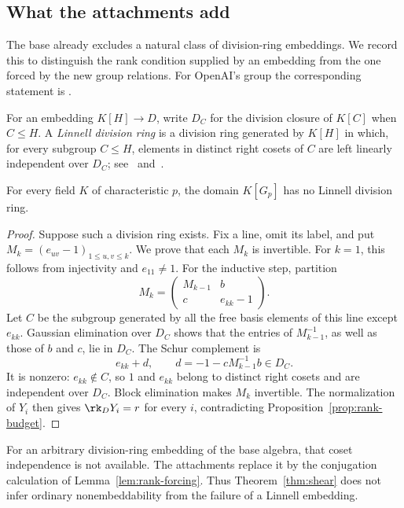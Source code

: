 \subsection{What the attachments add}

The base already excludes a natural class of division-ring embeddings.
We record this to distinguish the rank condition supplied by an
embedding from the one forced by the new group relations.
For OpenAI's group the corresponding statement is
\cite[Theorem~1.4 and Corollary~6.5]{DM}.

For an embedding \(K[H]\to D\), write \(D_C\) for the division
closure of \(K[C]\) when \(C\le H\).
A \emph{Linnell division ring} is a division ring generated by
\(K[H]\) in which, for every subgroup \(C\le H\), elements in
distinct right cosets of \(C\) are left linearly independent over
\(D_C\); see~\cite[Section~2.3]{JZL} and~\cite[Definition~2.2]{FSP}.

\begin{proposition}\label{prop:base-linnell}
For every field \(K\) of characteristic \(p\), the domain \(K[G_p]\)
has no Linnell division ring.
\end{proposition}

\begin{proof}
Suppose such a division ring exists. Fix a line, omit its label, and
put \(M_k=(e_{uv}-1)_{1\le u,v\le k}\).
We prove that each \(M_k\) is invertible. For \(k=1\), this follows
from injectivity and \(e_{11}\ne1\). For the inductive step, partition
\[
 M_k=\begin{pmatrix}M_{k-1}&b\\c&e_{kk}-1\end{pmatrix}.
\]
Let \(C\) be the subgroup generated by all the free basis elements
of this line except \(e_{kk}\). Gaussian elimination over \(D_C\)
shows that the entries of \(M_{k-1}^{-1}\), as well as those of
\(b\) and \(c\), lie in \(D_C\). The Schur complement is
\[
 e_{kk}+d,\qquad d=-1-cM_{k-1}^{-1}b\in D_C.
\]
It is nonzero: \(e_{kk}\notin C\), so \(1\) and \(e_{kk}\) belong
to distinct right cosets and are independent over \(D_C\).
Block elimination makes \(M_k\) invertible. The normalization of
\(Y_i\) then gives \(\rk_D Y_i=r\) for every \(i\), contradicting
Proposition~\ref{prop:rank-budget}.
\end{proof}

For an arbitrary division-ring embedding of the base algebra, that
coset independence is not available. The attachments replace it by
the conjugation calculation of Lemma~\ref{lem:rank-forcing}.
Thus Theorem~\ref{thm:shear} does not infer ordinary nonembeddability
from the failure of a Linnell embedding.

